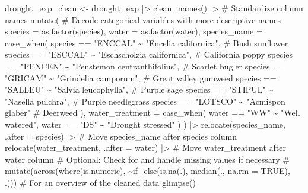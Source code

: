 \documentclass[
  letterpaper,
  DIV=11,
  numbers=noendperiod]{scrartcl}
\newenvironment{Shaded}{\begin{snugshade}}{\end{snugshade}}
\newcommand{\AttributeTok}[1]{\textcolor[rgb]{0.40,0.45,0.13}{#1}}
\newcommand{\CommentTok}[1]{\textcolor[rgb]{0.37,0.37,0.37}{#1}}
\newcommand{\FunctionTok}[1]{\textcolor[rgb]{0.28,0.35,0.67}{#1}}
\newcommand{\NormalTok}[1]{\textcolor[rgb]{0.00,0.23,0.31}{#1}}
\newcommand{\OtherTok}[1]{\textcolor[rgb]{0.00,0.23,0.31}{#1}}
\newcommand{\SpecialCharTok}[1]{\textcolor[rgb]{0.37,0.37,0.37}{#1}}
\newcommand{\StringTok}[1]{\textcolor[rgb]{0.13,0.47,0.30}{#1}}
\begin{document}
\begin{Shaded}
\begin{Highlighting}[]
\NormalTok{drought\_exp\_clean }\OtherTok{\textless{}{-}}\NormalTok{ drought\_exp }\SpecialCharTok{|\textgreater{}} 
  \FunctionTok{clean\_names}\NormalTok{() }\SpecialCharTok{|\textgreater{}}   \CommentTok{\# Standardize column names}
  \FunctionTok{mutate}\NormalTok{(}
    \CommentTok{\# Decode categorical variables with more descriptive names}
    \AttributeTok{species =} \FunctionTok{as.factor}\NormalTok{(species),}
    \AttributeTok{water =} \FunctionTok{as.factor}\NormalTok{(water),}
    \AttributeTok{species\_name =} \FunctionTok{case\_when}\NormalTok{(}
\NormalTok{      species }\SpecialCharTok{==} \StringTok{"ENCCAL"} \SpecialCharTok{\textasciitilde{}} \StringTok{"Encelia californica"}\NormalTok{,  }\CommentTok{\# Bush sunflower}
\NormalTok{      species }\SpecialCharTok{==} \StringTok{"ESCCAL"} \SpecialCharTok{\textasciitilde{}} \StringTok{"Eschscholzia californica"}\NormalTok{,  }\CommentTok{\# California poppy}
\NormalTok{      species }\SpecialCharTok{==} \StringTok{"PENCEN"} \SpecialCharTok{\textasciitilde{}} \StringTok{"Penstemon centranthifolius"}\NormalTok{,  }\CommentTok{\# Scarlet bugler}
\NormalTok{      species }\SpecialCharTok{==} \StringTok{"GRICAM"} \SpecialCharTok{\textasciitilde{}} \StringTok{"Grindelia camporum"}\NormalTok{,  }\CommentTok{\# Great valley gumweed}
\NormalTok{      species }\SpecialCharTok{==} \StringTok{"SALLEU"} \SpecialCharTok{\textasciitilde{}} \StringTok{"Salvia leucophylla"}\NormalTok{,  }\CommentTok{\# Purple sage}
\NormalTok{      species }\SpecialCharTok{==} \StringTok{"STIPUL"} \SpecialCharTok{\textasciitilde{}} \StringTok{"Nasella pulchra"}\NormalTok{,  }\CommentTok{\# Purple needlegrass}
\NormalTok{      species }\SpecialCharTok{==} \StringTok{"LOTSCO"} \SpecialCharTok{\textasciitilde{}} \StringTok{"Acmispon glaber"}  \CommentTok{\# Deerweed}
\NormalTok{    ),}
    \AttributeTok{water\_treatment =} \FunctionTok{case\_when}\NormalTok{(}
\NormalTok{      water }\SpecialCharTok{==} \StringTok{"WW"} \SpecialCharTok{\textasciitilde{}} \StringTok{"Well watered"}\NormalTok{,}
\NormalTok{      water }\SpecialCharTok{==} \StringTok{"DS"} \SpecialCharTok{\textasciitilde{}} \StringTok{"Drought stressed"}
\NormalTok{    )}
\NormalTok{  ) }\SpecialCharTok{|\textgreater{}} 
  \FunctionTok{relocate}\NormalTok{(species\_name, }\AttributeTok{.after =}\NormalTok{ species) }\SpecialCharTok{|\textgreater{}}   \CommentTok{\# Move species\_name after species column}
  \FunctionTok{relocate}\NormalTok{(water\_treatment, }\AttributeTok{.after =}\NormalTok{ water) }\SpecialCharTok{|\textgreater{}}   \CommentTok{\# Move water\_treatment after water column}
  \CommentTok{\# Optional: Check for and handle missing values if necessary}
  \CommentTok{\# mutate(across(where(is.numeric), \textasciitilde{}if\_else(is.na(.), median(., na.rm = TRUE), .)))}
  \CommentTok{\# For an overview of the cleaned data}
  \FunctionTok{glimpse}\NormalTok{()}
\end{Highlighting}
\end{Shaded}
\end{document}
